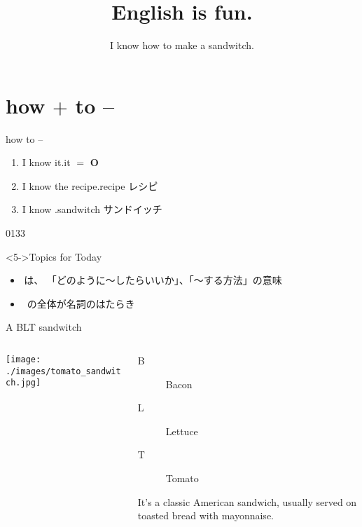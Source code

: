 \documentclass[aspectratio=169,xcolor={dvipsnames,table}]{beamer}
\title{English is fun.}
\subtitle{I know how to make a sandwitch.}
\author{}
\institute[]{}
\date[]
\begin{document}
\begin{frame}[plain]
  \titlepage
\end{frame}
\section{how $+$ to --}
\begin{frame}[plain]{how to --}
 \begin{enumerate}
  \item<1-> I know it.\hfill{}it $=$ \textbf{O}
  \item<2-> I know the recipe.\hfill{\scriptsize recipe  レシピ}
  \item<3-> I know .\hfill{\scriptsize sandwitch  サンドイッチ}
 \end{enumerate}
%
\hfill{\tiny 0133}\,{\scriptsize {}}
%
\begin{block}<5->{Topics for Today}
\begin{itemize}[square]\small
 \item {}\,は、
「どのように～したらいいか」、「～する方法」の意味
 \item  {}\, の全体が名詞のはたらき
 \end{itemize}
     \end{block}
\end{frame}
\begin{frame}[plain]{A BLT sandwitch}

\begin{columns}
\begin{column}{.55\textwidth} 
\texttt{[image: ./images/tomato\_sandwitch.jpg]}
\end{column}
\begin{column}{.4\textwidth}
\begin{description}
 \item[B] Bacon 
 \item[L] Lettuce 
 \item[T] Tomato 
\end{description}

\bigskip

It's a classic American sandwich, usually served on toasted bread with mayonnaise.
\end{column}
\end{columns}
\end{frame}
\end{document}
